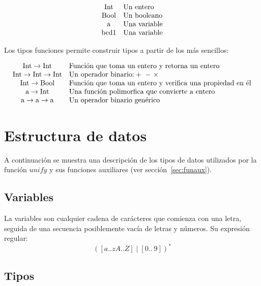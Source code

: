 \documentclass{article}
\theoremstyle{definition}
\begin{document}
\[
  \begin{array}[h]{cl}
    \text{Int} & \text{Un entero} \\
    \text{Bool} & \text{Un booleano} \\
    \text{a} & \text{Una variable} \\
    \text{bcd1} & \text{Una variable} \\
  \end{array}
\]

Los tipos funciones permite construir tipos a partir de los más
sencillos:

\[
  \begin{array}[h]{cl}
    \text{Int} \to \text{Int} & \text{Función que toma un entero y retorna un entero} \\
    \text{Int} \to \text{Int} \to \text{Int} & \text{Un operador binario:} +\ -\ \times\ \\
    \text{Int} \to \text{Bool} & \text{Función que toma un entero y verifica una propiedad en él} \\
    \text{a} \to \text{Int} & \text{Una función polimorfica que convierte a entero} \\
    \text{a} \to \text{a} \to \text{a} & \text{Un operador binario genérico} \\
  \end{array}
\]

\section{Estructura de datos}\label{sec:estructdatos}

A continuación se muestra una descripción de los tipos de datos
utilizados por la función $unify$ y sus funciones auxiliares (ver
sección~\ref{sec:funaux}).

\subsection{Variables}
\label{sec:var}

La variables son cualquier cadena de carácteres que comienza con una letra,
seguida de una secuencia posiblemente vacía de letras y números. Su expresión
regular:
\begin{equation*}
  [a..zA..Z]([a..zA..Z] \mid [0 ..\ 9])^*
\end{equation*}

\subsection{Tipos}
\label{sec:estrutipos}
\end{document}
